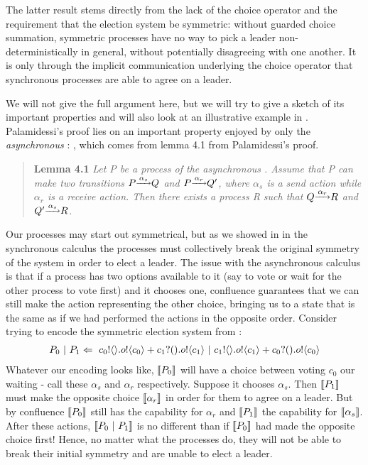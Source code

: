 The latter result stems directly from the lack of the choice operator and the requirement that the election system be symmetric: without guarded choice summation, symmetric processes have no way to pick a leader non-deterministically in general, without potentially disagreeing with one another.  
It is only through the implicit communication underlying the choice operator that synchronous processes are able to agree on a leader.

We will not give the full argument here, but we will try to give a sketch of its important properties and will also look at an illustrative example in .  
Palamidessi's proof lies on an important property enjoyed by only the \emph{asynchronous} \picalc:  , which comes from lemma 4.1 from Palamidessi's proof.
\begin{quote}
	\textbf{Lemma 4.1} \emph{Let P be a process of the asynchronous \picalc.  Assume that P can make two transitions $P \overset{\underrightarrow{\ {\alpha_s}\ }}{} Q$ and $P \overset{\underrightarrow{\ {\alpha_r}\ }}{} Q'$, where $\alpha_s$ is a send action while $\alpha_r$ is a receive action.  Then there exists a process R such that $Q \overset{\underrightarrow{\ {\alpha_r}\ }}{} R$ and $Q' \overset{\underrightarrow{\ {\alpha_s}\ }}{} R$.}
\end{quote}
Our processes may start out symmetrical, but as we showed in  in the synchronous calculus the processes must collectively break the original symmetry of the system in order to elect a leader.  
The issue with the asynchronous calculus is that if a process has two options available to it (say to vote or wait for the other process to vote first) and it chooses one, confluence guarantees that we can still make the action representing the other choice, bringing us to a state that is the same as if we had performed the actions in the opposite order.  
Consider trying to encode the symmetric election system from :
\begin{align}
	P_0\ |\  P_1 \Leftarrow\  {c_0}!\langle{}\rangle. {o}!\langle{c_0}\rangle + {c_1}?({}). {o}!\langle{c_1}\rangle \ |\  {c_1}!\langle{}\rangle. {o}!\langle{c_1}\rangle + {c_0}?({}). {o}!\langle{c_0}\rangle
	\label{leader_network_term2}	
\end{align}
Whatever our encoding looks like, $\llbracket{P_0}\rrbracket$ will have a choice between voting $c_0$ our waiting - call these $\alpha_s$ and $\alpha_r$ respectively.  
Suppose it chooses $\alpha_s$.  
Then $\llbracket{P_1}\rrbracket$ must make the opposite choice $\llbracket{\alpha_r}\rrbracket$ in order for them to agree on a leader.  
But by confluence $\llbracket{P_0}\rrbracket$ still has the capability for $\alpha_r$ and $\llbracket{P_1}\rrbracket$ the capability for $\llbracket{\alpha_s}\rrbracket$.  
After these actions, $\llbracket{P_0  \ensuremath{\ |\ } P_1}\rrbracket$ is no different than if $\llbracket{P_0}\rrbracket$ had made the opposite choice first!  Hence, no matter what the processes do, they will not be able to break their initial symmetry and are unable to elect a leader.

